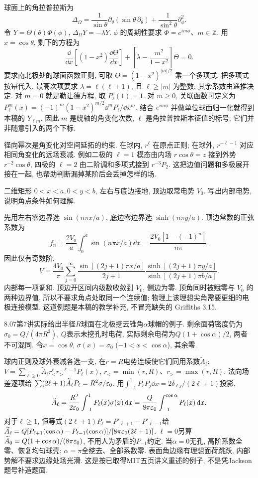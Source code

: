 球面上的角拉普拉斯为
\[
 \Delta_\Omega=\frac1{\sin\theta}\partial_\theta(\sin\theta\,\partial_\theta)
 +\frac1{\sin^2\theta}\partial_\phi^2.
\]
令 $Y=\Theta(\theta)\Phi(\phi)$, $\Delta_\Omega Y=-\lambda Y$. $\phi$ 的周期性要求 $\Phi=e^{im\phi}$、$m\in\mathbb Z$. 用 $x=\cos\theta$, 剩下的方程为
\[
 \frac\dd{\dd x}\left[(1-x^2)\frac{\dd\Theta}{\dd x}\right]
 +\left[\lambda-\frac{m^2}{1-x^2}\right]\Theta=0.
\]
要求南北极处的球面函数正则, 可取 $\Theta=(1-x^2)^{|m|/2}$ 乘一个多项式. 把多项式按幂代入, 最高次项要求 $\lambda=\ell(\ell+1)$, 且 $\ell\ge|m|$ 为整数; 其余系数由递推决定. 对 $m=0$ 就是勒让德方程, 取 $P_\ell(1)=1$. 对 $m\ge0$, 关联函数可定义为
$P_\ell^m(x)=(-1)^m(1-x^2)^{m/2}\dd^mP_\ell/\dd x^m$.
结合 $e^{im\phi}$ 并做单位球面归一化就得到本稿的 $Y_{\ell m}$. 因此 $m$ 是绕轴的角变化次数, $\ell$ 是角拉普拉斯本征值的标号; 它们并非随意引入的两个下标.

径向幂次是角变化对空间延拓的约束. 在球内, $r^\ell$ 在原点正则; 在球外, $r^{-\ell-1}$ 对应相同角变化的远场衰减. 例如二极的 $\ell=1$ 模态由内场 $r\cos\theta=z$ 接到外势 $r^{-2}\cos\theta$, 四极的 $\ell=2$ 由二阶调和多项式接到 $r^{-3}P_2$. 这把边值问题和多极展开接在一起, 也帮助判断漏掉某阶后会丢掉怎样的场.

\begin{example}
二维矩形 $0<x<a,0<y<b$, 左右与底边接地, 顶边取常电势 $V_0$. 写出内部电势, 说明角点条件如何理解.
\end{example}
\begin{solution}
先用左右零边界选 $\sin(n\pi x/a)$, 底边零边界选 $\sinh(n\pi y/a)$. 顶边常数的正弦系数为
\[ f_n=\frac{2V_0}{a}\int_0^a\sin(n\pi x/a)\dd x=\frac{2V_0[1-(-1)^n]}{n\pi}. \]
因此仅有奇数阶,
\[
 V=\frac{4V_0}{\pi}\sum_{j=0}^\infty
 \frac{\sin[(2j+1)\pi x/a]}{2j+1}
 \frac{\sinh[(2j+1)\pi y/a]}{\sinh[(2j+1)\pi b/a]}.
\]
内部每一项调和. 顶边开区间内级数收敛到 $V_0$, 侧边为零. 顶角同时被赋零与 $V_0$ 的两种边界值, 所以不要求角点处取同一个连续值; 物理上该理想尖角需要更细的电极连接模型. 这道例题是本稿的教学补充, 不冒充缺失的 Griffiths 3.15.
\end{solution}

8.07第7讲实际给出半径$R$球面在北极挖去锥角$\alpha$球帽的例子. 剩余面荷密度仍为$\sigma_0=Q/(4\pi R^2)$, $Q$表示未挖孔时电荷, 实际剩余电荷为$Q(1+\cos\alpha)/2$, 两者不可混同. 令$x=\cos\theta$, $\sigma(x)=\sigma_0$ ($-1<x<\cos\alpha$), 其余零.

球内正则及球外衰减各选一支, 在$r=R$电势连续使它们同用系数$\widetilde A_\ell$:
$V=\sum_{\ell\ge0}\widetilde A_\ell r_<^\ell r_>^{-\ell-1}P_\ell(x)$, $r_<=\min(r,R)$、$r_>=\max(r,R)$. 法向场差逐项给
$\sum(2\ell+1)\widetilde A_\ell P_\ell=R^2\sigma/\varepsilon_0$. 用$\int_{-1}^1P_\ell P_j\dd x=2\delta_{\ell j}/(2\ell+1)$投影,
\[
\widetilde A_\ell=\frac{R^2}{2\varepsilon_0}\int_{-1}^1P_\ell(x)\sigma(x)\,\mathrm d x
=\frac{Q}{8\pi\varepsilon_0}\int_{-1}^{\cos\alpha}P_\ell(x)\,\mathrm d x.
\]
对于$\ell\ge1$, 恒等式$(2\ell+1)P_\ell=P'_{\ell+1}-P'_{\ell-1}$给
$\widetilde A_\ell=Q[P_{\ell+1}(\cos\alpha)-P_{\ell-1}(\cos\alpha)]/[8\pi\varepsilon_0(2\ell+1)]$.
$\ell=0$另算$\widetilde A_0=Q(1+\cos\alpha)/(8\pi\varepsilon_0)$, 不用人为矛盾的$P_{-1}$约定. 当$\alpha=0$无孔, 高阶系数全零、恢复均匀球壳; $\alpha=\pi$全挖去、全部系数零. 表面角边缘有理想面荷跳跃, 内部势解不要求边缘处场光滑. 这是按已取得MIT五页讲义重述的例子, 不是凭Jackson题号补造题面.

